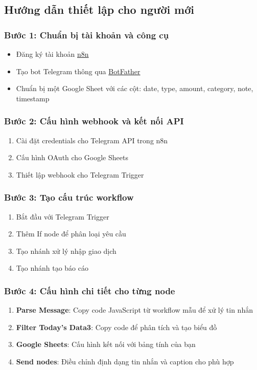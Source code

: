 \subsection{Hướng dẫn thiết lập cho người mới}

\subsubsection{Bước 1: Chuẩn bị tài khoản và công cụ}
\begin{itemize}
    \item Đăng ký tài khoản \href{https://n8n.io}{n8n}
    \item Tạo bot Telegram thông qua \href{https://t.me/botfather}{BotFather}
    \item Chuẩn bị một Google Sheet với các cột: date, type, amount, category, note, timestamp
\end{itemize}

\subsubsection{Bước 2: Cấu hình webhook và kết nối API}
\begin{enumerate}
    \item Cài đặt credentials cho Telegram API trong n8n
    \item Cấu hình OAuth cho Google Sheets
    \item Thiết lập webhook cho Telegram Trigger
\end{enumerate}

\subsubsection{Bước 3: Tạo cấu trúc workflow}
\begin{enumerate}
    \item Bắt đầu với Telegram Trigger
    \item Thêm If node để phân loại yêu cầu
    \item Tạo nhánh xử lý nhập giao dịch
    \item Tạo nhánh tạo báo cáo
\end{enumerate}

\subsubsection{Bước 4: Cấu hình chi tiết cho từng node}
\begin{enumerate}
    \item \textbf{Parse Message}: Copy code JavaScript từ workflow mẫu để xử lý tin nhắn
    \item \textbf{Filter Today's Data3}: Copy code để phân tích và tạo biểu đồ  
    \item \textbf{Google Sheets}: Cấu hình kết nối với bảng tính của bạn
    \item \textbf{Send nodes}: Điều chỉnh định dạng tin nhắn và caption cho phù hợp
\end{enumerate}

